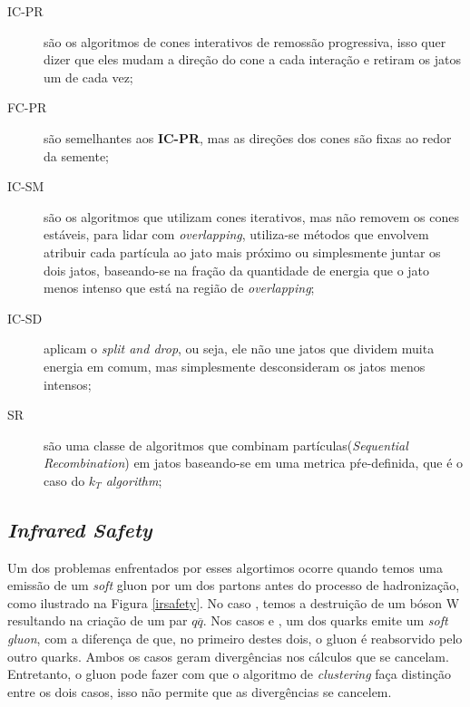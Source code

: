 \begin{description}
 \item[IC-PR] são os algoritmos de cones interativos de remossão progressiva, isso
 quer dizer que eles mudam a direção do cone a cada interação e retiram os jatos um de
 cada vez;
 \item[FC-PR] são semelhantes aos {\bf IC-PR}, mas as direções dos cones são fixas ao redor
 da semente;
 \item[IC-SM] são os algoritmos que utilizam cones iterativos, mas não removem os cones
 estáveis, para lidar com \emph{overlapping}, utiliza-se métodos que envolvem atribuir cada
 partícula ao jato mais próximo ou simplesmente juntar os dois jatos, baseando-se na fração
 da quantidade de energia que o jato menos intenso que está na região de \emph{overlapping};
 \item[IC-SD] aplicam o \emph{split and drop}, ou seja, ele não une jatos que dividem muita
 energia em comum, mas simplesmente desconsideram os jatos menos intensos;
 \item[SR] são uma classe de algoritmos que combinam partículas({\it Sequential Recombination}) em jatos baseando-se
 em uma metrica pŕe-definida, que é o caso do {\it $k_T$ algorithm};
\end{description}

\subsection{\emph{Infrared Safety}}

Um dos problemas enfrentados por esses algortimos ocorre quando temos uma emissão de um \emph{soft} gluon por um dos partons
antes do processo de hadronização, como ilustrado na Figura \ref{irsafety}. No caso , temos a destruição de um bóson W
resultando na criação de um par $q\overline{q}$. Nos casos  e , um dos quarks emite um
\emph{soft gluon}, com a diferença de que, no primeiro destes dois, o gluon é reabsorvido pelo outro quarks.
Ambos os casos geram divergências nos cálculos que se cancelam. Entretanto, o gluon pode fazer com que o algoritmo de
\emph{clustering} faça distinção entre os dois casos, isso não permite que as divergências se cancelem.

